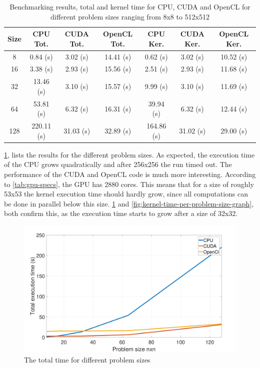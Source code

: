 \documentclass[final]{report}
\begin{document}
\begin{table}[H]
	\centering
	\caption{Benchmarking results, total and kernel time for CPU, CUDA and OpenCL for different problem sizes ranging from 8x8 to 512x512}
	\label{tab:results-problem-size}
	\begin{tabular}{ccccccc}
		\toprule
			\textbf{Size}		& \textbf{CPU Tot.}	& \textbf{CUDA Tot.}	& \textbf{OpenCL Tot.}	& \textbf{CPU Ker.}	& \textbf{CUDA Ker.}	& \textbf{OpenCL Ker.}\\
		\midrule
			8					& 0.84 (s)			& 3.02 (s)				& 14.41 (s)				& 0.62 (s)			& 3.02 (s)				& 10.52 (s) \\
			16					& 3.38 (s)			& 2.93 (s)				& 15.56 (s)				& 2.51 (s)			& 2.93 (s)				& 11.68 (s) \\
			32					& 13.46 (s)			& 3.10 (s)				& 15.57 (s)				& 9.99 (s)			& 3.10 (s)				& 11.69 (s) \\
			64					& 53.81 (s)			& 6.32 (s)				& 16.31 (s)				& 39.94 (s)			& 6.32 (s)				& 12.44 (s) \\
			128					& 220.11 (s)		& 31.03 (s)				& 32.89 (s)				& 164.86 (s)		& 31.02 (s)				& 29.00 (s) \\
		\bottomrule
	\end{tabular}
\end{table}

\cref{tab:results-problem-size}, lists the results for the different problem sizes.
As expected, the execution time of the CPU grows quadratically and after 256x256 the run timed out. 
The performance of the CUDA and OpenCL code is much more interesting.
According to \cref{tab:gpu-specs}, the GPU has 2880 cores.
This means that for a size of roughly 53x53 the kernel execution time should hardly grow, since all computations can be done in parallel below this size.
\cref{fig:exe-time-per-problem-size-graph} and \cref{fig:kernel-time-per-problem-size-graph}, both confirm this, as the execution time starts to grow after a size of 32x32.

\begin{figure}[H]
\centering
    \includegraphics[width=\textwidth]{resources/exe-time-per-problem-size-graph.pdf}
    \caption{The total time for different problem sizes}
    \label{fig:exe-time-per-problem-size-graph}
\end{figure}
\end{document}
